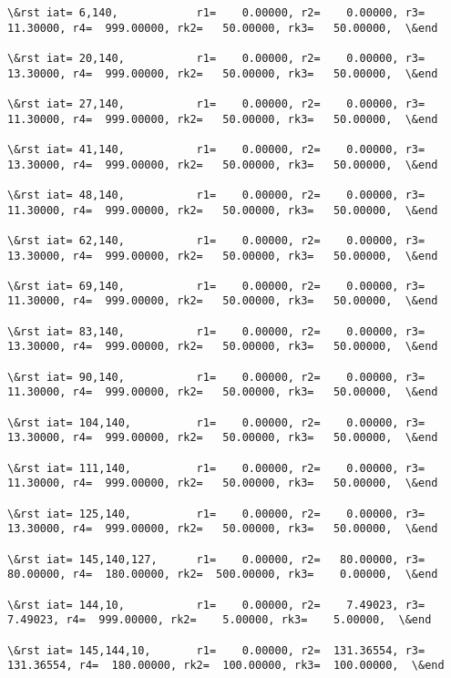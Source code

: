 \documentclass[11pt]{article}
\begin{document}
\begin{Verbatim}[commandchars=\\\{\}]
\&rst iat= 6,140,            r1=    0.00000, r2=    0.00000, r3=   11.30000, r4=  999.00000, rk2=   50.00000, rk3=   50.00000,  \&end

\&rst iat= 20,140,           r1=    0.00000, r2=    0.00000, r3=   13.30000, r4=  999.00000, rk2=   50.00000, rk3=   50.00000,  \&end

\&rst iat= 27,140,           r1=    0.00000, r2=    0.00000, r3=   11.30000, r4=  999.00000, rk2=   50.00000, rk3=   50.00000,  \&end

\&rst iat= 41,140,           r1=    0.00000, r2=    0.00000, r3=   13.30000, r4=  999.00000, rk2=   50.00000, rk3=   50.00000,  \&end

\&rst iat= 48,140,           r1=    0.00000, r2=    0.00000, r3=   11.30000, r4=  999.00000, rk2=   50.00000, rk3=   50.00000,  \&end

\&rst iat= 62,140,           r1=    0.00000, r2=    0.00000, r3=   13.30000, r4=  999.00000, rk2=   50.00000, rk3=   50.00000,  \&end

\&rst iat= 69,140,           r1=    0.00000, r2=    0.00000, r3=   11.30000, r4=  999.00000, rk2=   50.00000, rk3=   50.00000,  \&end

\&rst iat= 83,140,           r1=    0.00000, r2=    0.00000, r3=   13.30000, r4=  999.00000, rk2=   50.00000, rk3=   50.00000,  \&end

\&rst iat= 90,140,           r1=    0.00000, r2=    0.00000, r3=   11.30000, r4=  999.00000, rk2=   50.00000, rk3=   50.00000,  \&end

\&rst iat= 104,140,          r1=    0.00000, r2=    0.00000, r3=   13.30000, r4=  999.00000, rk2=   50.00000, rk3=   50.00000,  \&end

\&rst iat= 111,140,          r1=    0.00000, r2=    0.00000, r3=   11.30000, r4=  999.00000, rk2=   50.00000, rk3=   50.00000,  \&end

\&rst iat= 125,140,          r1=    0.00000, r2=    0.00000, r3=   13.30000, r4=  999.00000, rk2=   50.00000, rk3=   50.00000,  \&end

\&rst iat= 145,140,127,      r1=    0.00000, r2=   80.00000, r3=   80.00000, r4=  180.00000, rk2=  500.00000, rk3=    0.00000,  \&end

\&rst iat= 144,10,           r1=    0.00000, r2=    7.49023, r3=    7.49023, r4=  999.00000, rk2=    5.00000, rk3=    5.00000,  \&end

\&rst iat= 145,144,10,       r1=    0.00000, r2=  131.36554, r3=  131.36554, r4=  180.00000, rk2=  100.00000, rk3=  100.00000,  \&end


\end{Verbatim}
\end{document}
